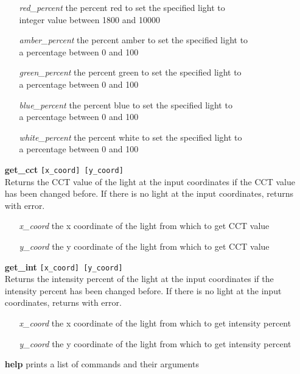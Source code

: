 \documentclass[twoside]{article}
\begin{document}
\begin{enumerate}
\begin{enumerate}[leftmargin=3\parindent]
			\item[{\it red\_percent}] the percent red to set the specified light to\\
			integer value between 1800 and 10000
			\item[{\it amber\_percent}] the percent amber to set the specified light to\\
			a percentage between 0 and 100
			\item[{\it green\_percent}] the percent green to set the specified light to\\
			a percentage between 0 and 100
			\item[{\it blue\_percent}] the percent blue to set the specified light to\\
			a percentage between 0 and 100
			\item[{\it white\_percent}] the percent white to set the specified light to\\
			a percentage between 0 and 100
		\end{enumerate}
		\item[\bf get\_cct] \verb|[x_coord] [y_coord]|\\
		Returns the CCT value of the light at the input coordinates if the CCT value has been changed before.
		If there is no light at the input coordinates, returns with error.
		\begin{enumerate}[leftmargin=3\parindent]
			\item[{\it x\_coord}] the x coordinate of the light from which to get CCT value
			\item[{\it y\_coord}] the y coordinate of the light from which to get CCT value
		\end{enumerate}
		\item[\bf get\_int] \verb|[x_coord] [y_coord]|\\
		Returns the intensity percent of the light at the input coordinates if the intensity percent has been changed before.
		If there is no light at the input coordinates, returns with error.
		\begin{enumerate}[leftmargin=3\parindent]
			\item[{\it x\_coord}] the x coordinate of the light from which to get intensity percent
			\item[{\it y\_coord}] the y coordinate of the light from which to get intensity percent
		\end{enumerate}
		\item[\bf help] prints a list of commands and their arguments
		
	\end{enumerate}
	
\end{document}
